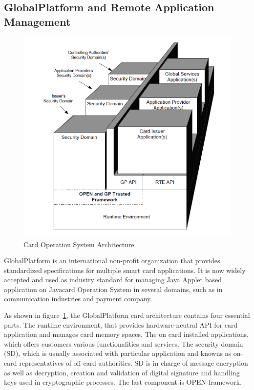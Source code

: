 \documentclass[]{llncs}
\begin{document}
\subsection{GlobalPlatform and Remote Application Management}

\begin{figure}[!htbp]
	\centering
	\includegraphics[width=1.2\textwidth]{gp_1.jpg}
		\caption[ ]{Card Operation System Architecture\cite{gp}}
	\label{fig:gp_1}
\end{figure}
GlobalPlatform is an international non-profit organization that provides standardized specifications for multiple smart card applications. It is now widely accepted and used as industry standard for managing Java Applet based application on Javacard Operation System in several domains, such  as in communication industries and payment company\cite{gp}. 

As shown in figure~\ref{fig:gp_1},  the GlobalPlatform card architecture contains four essential parts. The runtime environment, that provides hardware-neutral API for card application  and manages card memory spaces. The on card installed applications, which offers customers various functionalities and services. The security domain (SD), which is usually associated with particular application and knowns as on-card representatives  of off-card  authorities. SD is in charge of message encryption as well as decryption, creation and validation of digital signature and handling keys used in cryptographic processes. The last component is OPEN framework\cite{gp}.
\end{document}
